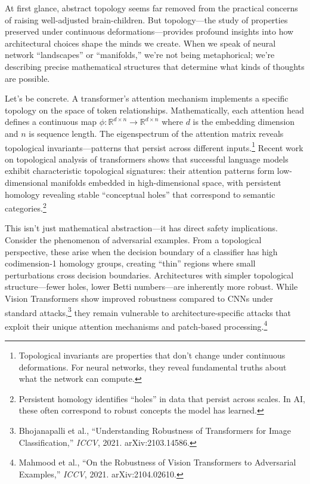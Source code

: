 \documentclass[acmsmall,screen]{acmart}
\begin{document}
At first glance, abstract topology seems far removed from the practical concerns of raising well-adjusted brain-children.
But topology---the study of properties preserved under continuous deformations---provides profound insights into how architectural choices shape the minds we create.
When we speak of neural network ``landscapes'' or ``manifolds,'' we're not being metaphorical; we're describing precise mathematical structures that determine what kinds of thoughts are possible.

Let's be concrete. A transformer's attention mechanism implements a specific topology on the space of token relationships. Mathematically, each attention head defines a continuous map $\phi: \mathbb{R}^{d \times n} \rightarrow \mathbb{R}^{d \times n}$ where $d$ is the embedding dimension and $n$ is sequence length. The eigenspectrum of the attention matrix reveals topological invariants---patterns that persist across different inputs.\footnote{Topological invariants are properties that don't change under continuous deformations. For neural networks, they reveal fundamental truths about what the network can compute.} Recent work on topological analysis of transformers shows that successful language models exhibit characteristic topological signatures: their attention patterns form low-dimensional manifolds embedded in high-dimensional space, with persistent homology revealing stable ``conceptual holes'' that correspond to semantic categories.\footnote{Persistent homology identifies ``holes'' in data that persist across scales. In AI, these often correspond to robust concepts the model has learned.}

This isn't just mathematical abstraction---it has direct safety implications.
Consider the phenomenon of adversarial examples.
From a topological perspective, these arise when the decision boundary of a classifier has high codimension-1 homology groups, creating ``thin'' regions where small perturbations cross decision boundaries.
Architectures with simpler topological structure---fewer holes, lower Betti numbers---are inherently more robust.
While Vision Transformers show improved robustness compared to CNNs under standard attacks,\footnote{Bhojanapalli et al., ``Understanding Robustness of Transformers for Image Classification,'' \textit{ICCV}, 2021. arXiv:2103.14586.} they remain vulnerable to architecture-specific attacks that exploit their unique attention mechanisms and patch-based processing.\footnote{Mahmood et al., ``On the Robustness of Vision Transformers to Adversarial Examples,'' \textit{ICCV}, 2021. arXiv:2104.02610.}
\end{document}
